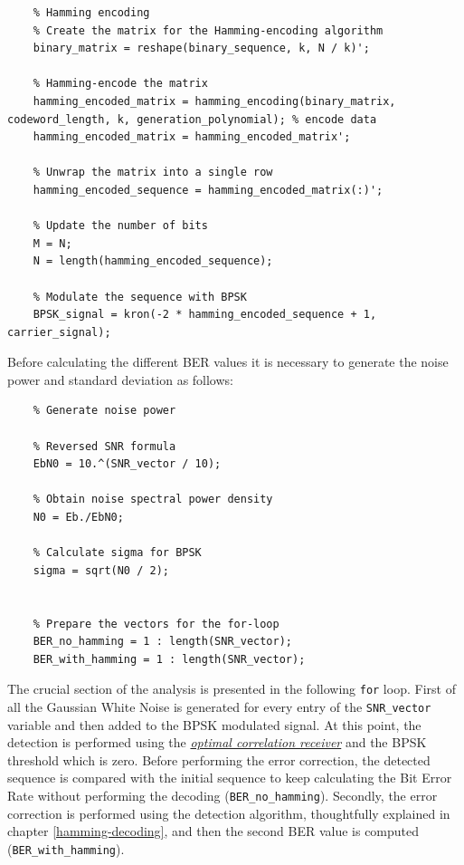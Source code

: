 \begin{lstlisting}
    % Hamming encoding
    % Create the matrix for the Hamming-encoding algorithm
    binary_matrix = reshape(binary_sequence, k, N / k)';

    % Hamming-encode the matrix
    hamming_encoded_matrix = hamming_encoding(binary_matrix, codeword_length, k, generation_polynomial); % encode data
    hamming_encoded_matrix = hamming_encoded_matrix';

    % Unwrap the matrix into a single row
    hamming_encoded_sequence = hamming_encoded_matrix(:)';

    % Update the number of bits
    M = N;
    N = length(hamming_encoded_sequence);

    % Modulate the sequence with BPSK
    BPSK_signal = kron(-2 * hamming_encoded_sequence + 1, carrier_signal);
\end{lstlisting}

\noindent Before calculating the different BER values it is necessary to generate the noise power and standard deviation as follows:

\begin{lstlisting}
    % Generate noise power

    % Reversed SNR formula
    EbN0 = 10.^(SNR_vector / 10);
    
    % Obtain noise spectral power density
    N0 = Eb./EbN0;
    
    % Calculate sigma for BPSK
    sigma = sqrt(N0 / 2);  
    
    
    % Prepare the vectors for the for-loop
    BER_no_hamming = 1 : length(SNR_vector);
    BER_with_hamming = 1 : length(SNR_vector);
\end{lstlisting}

\noindent The crucial section of the analysis is presented in the following \texttt{for} loop. First of all the Gaussian White Noise is generated for every entry of the \texttt{SNR\_vector} variable and then added to the BPSK modulated signal. At this point, the detection is performed using the \href{https://github.com/imAlessas/telecom-lab-works/blob/main/reports/lab-4/Trigolo_Report_Lab4.pdf}{\textsl{optimal correlation receiver}} and the BPSK threshold which is zero. Before performing the error correction, the detected sequence is compared with the initial sequence to keep calculating the Bit Error Rate without performing the decoding (\texttt{BER\_no\_hamming}). Secondly, the error correction is performed using the detection algorithm, thoughtfully explained in chapter \ref{hamming-decoding}, and then the second BER value is computed (\texttt{BER\_with\_hamming}).


